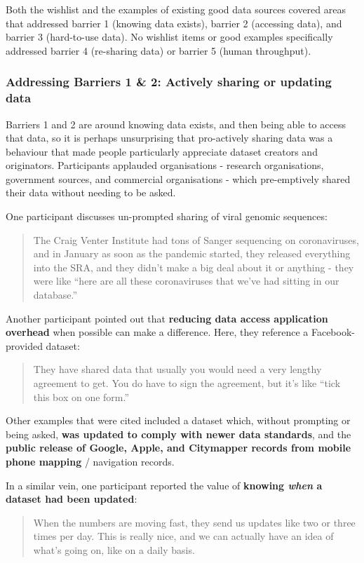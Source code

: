 \documentclass{CUP-JNL-DAP}%
\begin{document}
Both the wishlist and the examples of existing good data sources covered areas that addressed barrier 1 (knowing data exists), barrier 2 (accessing data), and barrier 3 (hard-to-use data). No wishlist items or good examples specifically addressed barrier 4 (re-sharing data) or barrier 5 (human throughput). 

\subsubsection{Addressing Barriers 1 \& 2: Actively sharing or updating data} 
Barriers 1 and 2 are around knowing data exists, and then being able to access that data, so it is perhaps unsurprising that pro-actively sharing data was a behaviour that made people particularly appreciate dataset creators and originators. Participants applauded organisations - research organisations, government sources, and commercial organisations - which pre-emptively shared their data without needing to be asked.

One participant discusses un-prompted sharing of viral genomic sequences: 

\blockquote{The Craig Venter Institute had tons of Sanger sequencing on coronaviruses, and in January as soon as the pandemic started, they released everything into the SRA, and they didn't make a big deal about it or anything - they were like \enquote{here are all these coronaviruses that we've had sitting in our database.}}

Another participant pointed out that \textbf{reducing data access application overhead} when possible can make a difference. Here, they reference a Facebook-provided dataset: 

\blockquote{They have shared data that usually you would need a very lengthy agreement to get. You do have to sign the agreement, but it's like \enquote{tick this box on one form.}}

Other examples that were cited included a dataset which, without prompting or being asked, \textbf{was updated to comply with newer data standards}, and the \textbf{public release of Google, Apple, and Citymapper records from mobile phone mapping} / navigation records. 

In a similar vein, one participant reported the value of \textbf{knowing \textit{when} a dataset had been updated}:

\blockquote{When the numbers are moving fast, they send us updates like two or three times per day. This is really nice, and we can actually have an idea of what's going on, like on a daily basis.}
\end{document}
